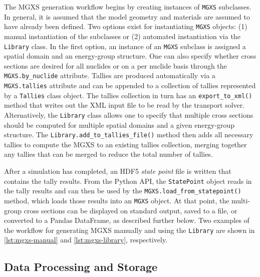 The MGXS generation workflow begins by creating instances of \texttt{MGXS} subclasses. In general, it is assumed that the model geometry and materials are assumed to have already been defined. Two options exist for instantiating \texttt{MGXS} objects: (1) manual instantiation of the subclasses or (2) automated instantiation via the \texttt{Library} class. In the first option, an instance of an \texttt{MGXS} subclass is assigned a spatial domain and an energy-group structure. One can also specify whether cross sections are desired for all nuclides or on a per nuclide basis through the \texttt{MGXS.by_nuclide} attribute. Tallies are produced automatically via a \texttt{MGXS.tallies} attribute and can be appended to a collection of tallies represented by a \texttt{Tallies} class object. The tallies collection in turn has an \texttt{export_to_xml()} method that writes out the XML input file to be read by the transport solver. Alternatively, the \texttt{Library} class allows one to specify that multiple cross sections should be computed for multiple spatial domains and a given energy-group structure. The \texttt{Library.add_to_tallies_file()} method then adds all necessary tallies to compute the MGXS to an existing tallies collection, merging together any tallies that can be merged to reduce the total number of tallies.

After a simulation has completed, an HDF5 \emph{state point} file is written
that contains the tally results. From the Python API, the \texttt{StatePoint}
object reads in the tally results and can then be used by the
\texttt{MGXS.load_from_statepoint()} method, which loads those results into an
\texttt{MGXS} object. At that point, the multi-group cross sections can be displayed on standard output, saved to a file, or converted to a Pandas DataFrame, as described further below. Two examples of the workflow for generating MGXS manually and using the \texttt{Library} are shown in \cref{lst:mgxs-manual} and \cref{lst:mgxs-library}, respectively.






\subsection{Data Processing and Storage}
\label{subsec:data-processing}

